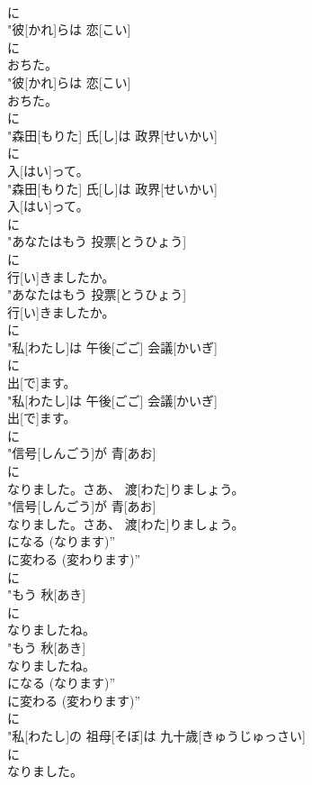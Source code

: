 \documentclass[8pt]{extreport}
\begin{document}
\begin{CJK}{UTF8}{min}
\\	に
\\	"彼[かれ]らは 恋[こい]
\\	に
\\	おちた。
\\	"彼[かれ]らは 恋[こい]
\\	おちた。
\\	に
\\	"森田[もりた] 氏[し]は 政界[せいかい]
\\	に
\\	入[はい]って。
\\	"森田[もりた] 氏[し]は 政界[せいかい]
\\	入[はい]って。
\\	に
\\	"あなたはもう 投票[とうひょう]
\\	に
\\	行[い]きましたか。
\\	"あなたはもう 投票[とうひょう]
\\	行[い]きましたか。
\\	に
\\	"私[わたし]は 午後[ごご] 会議[かいぎ]
\\	に
\\	出[で]ます。
\\	"私[わたし]は 午後[ごご] 会議[かいぎ]
\\	出[で]ます。
\\	に
\\	"信号[しんごう]が 青[あお]
\\	に
\\	なりました。さあ、 渡[わた]りましょう。
\\	"信号[しんごう]が 青[あお]
\\	なりました。さあ、 渡[わた]りましょう。
\\	になる (なります)” 
\\	に変わる (変わります)”	
\\	に
\\	"もう 秋[あき]
\\	に
\\	なりましたね。
\\	"もう 秋[あき]
\\	なりましたね。
\\	になる (なります)” 
\\	に変わる (変わります)”	
\\	に
\\	"私[わたし]の 祖母[そぼ]は 九十歳[きゅうじゅっさい]
\\	に
\\	なりました。

\end{CJK}
\end{document}
